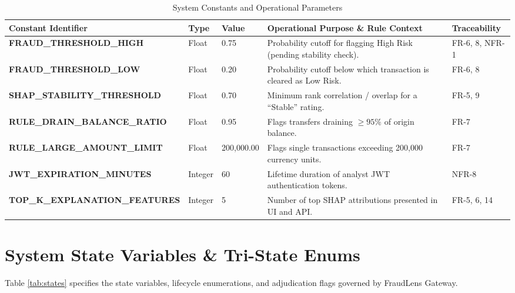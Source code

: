 \documentclass[12pt, a4paper]{report}
\begin{document}
\begin{table}[h]
\centering
\small
\begin{tabularx}{\textwidth}{|R{4.4cm}|l|l|X|R{2.3cm}|}
\hline
{}
\textbf{{Constant Identifier}} & \textbf{{Type}} & \textbf{{Value}} & \textbf{{Operational Purpose \& Rule Context}} & \textbf{{Traceability}} \\
\hline
\textbf{FRAUD\_\allowbreak{}THRESHOLD\_\allowbreak{}HIGH} & Float & 0.75 & Probability cutoff for flagging High Risk (pending stability check). & FR-6, 8, NFR-1 \\
\hline
\textbf{FRAUD\_\allowbreak{}THRESHOLD\_\allowbreak{}LOW} & Float & 0.20 & Probability cutoff below which transaction is cleared as Low Risk. & FR-6, 8 \\
\hline
\textbf{SHAP\_\allowbreak{}STABILITY\_\allowbreak{}THRESHOLD} & Float & 0.70 & Minimum rank correlation / overlap for a ``Stable'' rating. & FR-5, 9 \\
\hline
\textbf{RULE\_\allowbreak{}DRAIN\_\allowbreak{}BALANCE\_\allowbreak{}RATIO} & Float & 0.95 & Flags transfers draining $\ge 95\%$ of origin balance. & FR-7 \\
\hline
\textbf{RULE\_\allowbreak{}LARGE\_\allowbreak{}AMOUNT\_\allowbreak{}LIMIT} & Float & 200,000.00 & Flags single transactions exceeding 200,000 currency units. & FR-7 \\
\hline
\textbf{JWT\_\allowbreak{}EXPIRATION\_\allowbreak{}MINUTES} & Integer & 60 & Lifetime duration of analyst JWT authentication tokens. & NFR-8 \\
\hline
\textbf{TOP\_\allowbreak{}K\_\allowbreak{}EXPLANATION\_\allowbreak{}FEATURES} & Integer & 5 & Number of top SHAP attributions presented in UI and API. & FR-5, 6, 14 \\
\hline
\end{tabularx}
\caption{System Constants and Operational Parameters}
\label{tab:constants}
\end{table}

\section{System State Variables \& Tri-State Enums}
Table \ref{tab:states} specifies the state variables, lifecycle enumerations, and adjudication flags governed by FraudLens Gateway.
\end{document}
